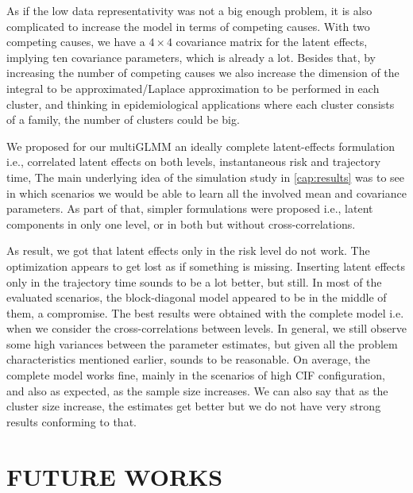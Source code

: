 As if the low data representativity was not a big enough problem, it is
also complicated to increase the model in terms of competing
causes. With two competing causes, we have a \(4\times4\) covariance
matrix for the latent effects, implying ten covariance parameters, which
is already a lot. Besides that, by increasing the number of competing
causes we also increase the dimension of the integral to be
approximated/Laplace approximation to be performed in each cluster, and
thinking in epidemiological applications where each cluster consists of
a family, the number of clusters could be big.

We proposed for our multiGLMM an ideally complete latent-effects
formulation i.e., correlated latent effects on both levels,
instantaneous risk and trajectory time, The main underlying idea of the
simulation study in \autoref{cap:results} was to see in which scenarios
we would be able to learn all the involved mean and covariance
parameters. As part of that, simpler formulations were proposed i.e.,
latent components in only one level, or in both but without
cross-correlations.

As result, we got that latent effects only in the risk level do not
work.  The optimization appears to get lost as if something is missing.
Inserting latent effects only in the trajectory time sounds to be a lot
better, but still. In most of the evaluated scenarios, the
block-diagonal model appeared to be in the middle of them, a
compromise. The best results were obtained with the complete model
i.e. when we consider the cross-correlations between levels. In general,
we still observe some high variances between the parameter estimates,
but given all the problem characteristics mentioned earlier, sounds to
be reasonable. On average, the complete model works fine, mainly in the
scenarios of high CIF configuration, and also as expected, as the sample
size increases. We can also say that as the cluster size increase, the
estimates get better but we do not have very strong results conforming
to that.

\section{FUTURE WORKS}
\label{cap:future}

\cite{mcglm}
\cite{rmcglm}

